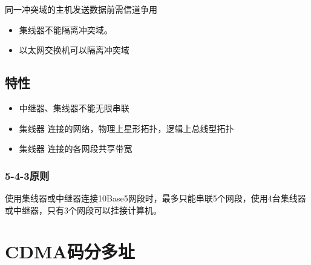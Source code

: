 同一冲突域的主机发送数据前需信道争用

\begin{itemize}
    \item 集线器不能隔离冲突域。
    \item 以太网交换机可以隔离冲突域
\end{itemize}


\subsection{特性}
\begin{itemize}
    \item 中继器、集线器不能无限串联
    \item 集线器 连接的网络，物理上星形拓扑，逻辑上总线型拓扑
    \item 集线器 连接的各网段共享带宽
\end{itemize}

\subsubsection{5-4-3原则}
使用集线器或中继器连接10Base5网段时，最多只能串联5个网段，使用4台集线器或中继器，只有3个网段可以挂接计算机。


\section{CDMA码分多址}


